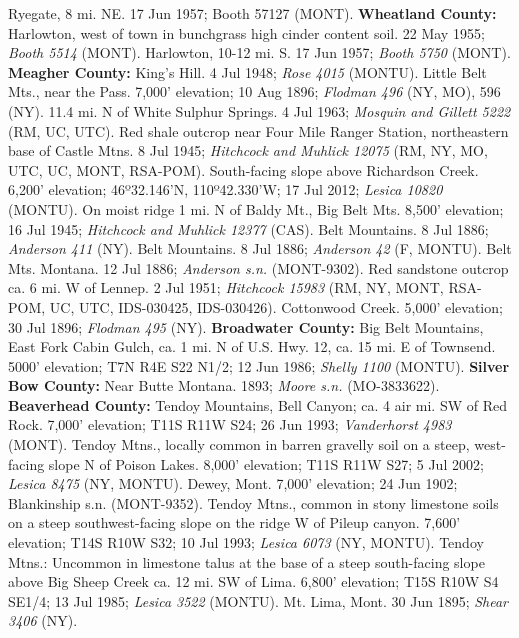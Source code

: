 Ryegate, 8 mi. NE.  17 Jun 1957; Booth 57127 (MONT).
  \textbf{Wheatland County:}
Harlowton, west of town in bunchgrass high cinder content soil. 22 May 1955;
\textit{Booth 5514} (MONT).
Harlowton, 10-12 mi. S. 17 Jun 1957; \textit{Booth 5750} (MONT).
  \textbf{Meagher County:}
King's Hill. 4 Jul 1948; \textit{Rose 4015} (MONTU).
Little Belt Mts., near the Pass. 7,000’ elevation; 10 Aug 1896;
\textit{Flodman 496} (NY, MO), 596 (NY).
11.4 mi. N of White Sulphur Springs. 4 Jul 1963;
\textit{Mosquin and Gillett 5222} (RM, UC, UTC).
Red shale outcrop near Four Mile Ranger Station, northeastern base of Castle
Mtns. 8 Jul 1945; \textit{Hitchcock and Muhlick 12075}
(RM, NY, MO, UTC, UC, MONT, RSA-POM). 
South-facing slope above Richardson Creek. 6,200’ elevation;
46º32.146'N, 110º42.330'W; 17 Jul 2012; \textit{Lesica 10820} (MONTU).
On moist ridge 1 mi. N of Baldy Mt., Big Belt Mts. 8,500’ elevation;
16 Jul 1945; \textit{Hitchcock and Muhlick 12377} (CAS).
Belt Mountains. 8 Jul 1886; \textit{Anderson 411} (NY).
Belt Mountains. 8 Jul 1886; \textit{Anderson 42} (F, MONTU).
Belt Mts. Montana.  12 Jul 1886; \textit{Anderson s.n.} (MONT-9302).
Red sandstone outcrop ca. 6 mi. W of Lennep. 2 Jul 1951;
\textit{Hitchcock 15983}
(RM, NY, MONT, RSA-POM, UC, UTC, IDS-030425, IDS-030426).
Cottonwood Creek. 5,000’ elevation; 30 Jul 1896; \textit{Flodman 495} (NY).
  \textbf{Broadwater County:}
Big Belt Mountains, East Fork Cabin Gulch, ca. 1 mi. N of U.S. Hwy. 12, ca. 15
mi. E of Townsend. 5000' elevation; T7N R4E S22 N1/2; 12 Jun 1986;
\textit{Shelly 1100} (MONTU).
  \textbf{Silver Bow County:}
Near Butte Montana. 1893; \textit{Moore s.n.} (MO-3833622).
  \textbf{Beaverhead County:}
Tendoy Mountains, Bell Canyon; ca. 4 air mi. SW of Red Rock.  7,000’ elevation;
T11S R11W S24; 26 Jun 1993; \textit{Vanderhorst 4983} (MONT).
Tendoy Mtns., locally common in barren gravelly soil on a steep, west-facing
slope N of Poison Lakes. 8,000’ elevation; T11S R11W S27; 5 Jul 2002;
\textit{Lesica 8475} (NY, MONTU).
Dewey, Mont. 7,000’ elevation; 24 Jun 1902; Blankinship s.n. (MONT-9352).
Tendoy Mtns., common in stony limestone soils on a steep southwest-facing slope
on the ridge W of Pileup canyon. 7,600’ elevation; T14S R10W S32; 10 Jul 1993;
\textit{Lesica 6073} (NY, MONTU).
Tendoy Mtns.: Uncommon in limestone talus at the base of a steep south-facing
slope above Big Sheep Creek ca. 12 mi. SW of Lima. 6,800' elevation;
T15S R10W S4 SE1/4; 13 Jul 1985; \textit{Lesica 3522} (MONTU).
Mt. Lima, Mont. 30 Jun 1895; \textit{Shear 3406} (NY).
